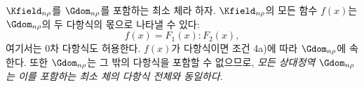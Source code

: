 
$\Kfield_{n\rho}$를 $\Gdom_{n\rho}$를 포함하는 최소 체라 하자. $\Kfield_{n\rho}$의 모든 함수 $f(x)$는 $\Gdom_{n\rho}$의 두 다항식의 몫으로 나타낼 수 있다:
\[
f(x)=F_1(x):F_2(x),
\]
여기서는 0차 다항식도 허용한다. $f(x)$가 다항식이면 조건 4a)에 따라 $\Gdom_{n\rho}$에 속한다. 또한 $\Gdom_{n\rho}$는 그 밖의 다항식을 포함할 수 없으므로, \emph{모든 상대정역 $\Gdom_{n\rho}$는 이를 포함하는 최소 체의 다항식 전체와 동일하다.}

